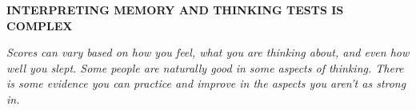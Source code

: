 \begin{center}
    \textbf{INTERPRETING MEMORY AND THINKING TESTS IS COMPLEX}

    \emph{
        Scores can vary based on how you feel, what you are thinking about, and
        even how well you slept. Some people are naturally good in some aspects
        of thinking. There is some evidence you can practice and improve in the
        aspects you aren’t as strong in.
        }    
\end{center}
\newpage
